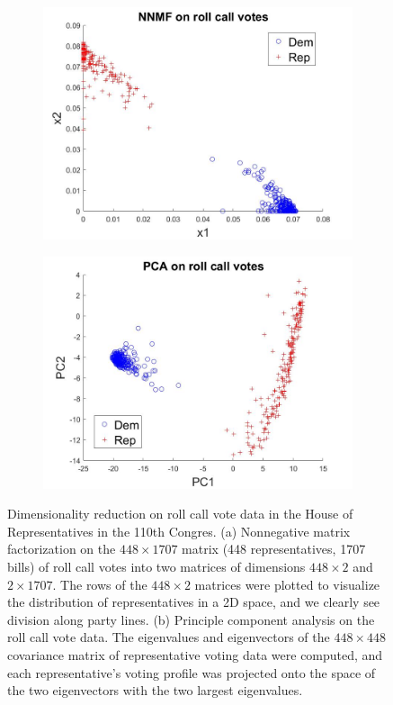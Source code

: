 \documentclass{article}
\begin{document}
\begin{figure}[!h]
  \centering
    \begin{subfigure}[b]{0.4\textwidth}
        \includegraphics[width=\textwidth]{NNMF_votes.jpg}
        \caption{}
        \label{fig:NNMF}
    \end{subfigure}
          \begin{subfigure}[b]{0.4\textwidth}
        \includegraphics[width=\textwidth]{PCA_votes}
        \caption{}
        \label{fig:PCA}
    \end{subfigure}
  \caption{Dimensionality reduction on roll call vote data in the House of Representatives in the 110th Congres. (a) Nonnegative matrix factorization on the $448\times 1707$ matrix (448 representatives, 1707 bills) of roll call votes into two matrices of dimensions $448\times 2$ and $2\times 1707$. The rows of the $448\times 2$ matrices were plotted to visualize the distribution of representatives in a 2D space, and we clearly see division along party lines. (b) Principle component analysis on the roll call vote data. The eigenvalues and eigenvectors of the $448\times 448$ covariance matrix of representative voting data were computed, and each representative's voting profile was projected onto the space of the two eigenvectors with the two largest eigenvalues.}
  \label{fig:DimRedux}
\end{figure}
\end{document}
